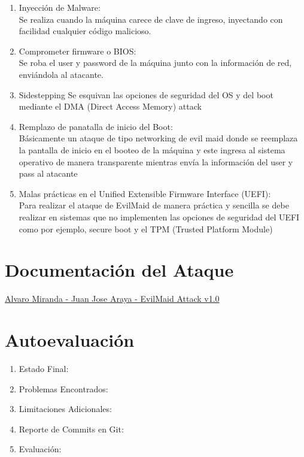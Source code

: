 \documentclass{article}
\begin{document}
\begin{enumerate}

  \item Inyección de Malware: \\
  Se realiza cuando la máquina carece de clave de ingreso, inyectando con facilidad cualquier código malicioso.
  
  \item Comprometer firmware o BIOS: \\
  Se roba el user y password de la máquina junto con la información de red, enviándola al atacante.
  
  \item Sidestepping
  Se esquivan las opciones de seguridad del OS y del boot mediante el DMA (Direct Access Memory) attack
  
  \item Remplazo de panatalla de inicio del Boot: \\
  Básicamente un ataque de tipo networking de evil maid donde se reemplaza la pantalla de inicio en el booteo de la máquina y este ingresa al sistema operativo de manera transparente mientras envía la información del user y pass al atacante
  
  \item Malas prácticas en el Unified Extensible Firmware Interface (UEFI): \\ 
  Para realizar el ataque de EvilMaid de manera práctica y sencilla se debe realizar en sistemas que no implementen las opciones de seguridad del UEFI como por ejemplo, secure boot y el TPM (Trusted Platform Module)
  
\end{enumerate}

\section*{Documentación del Ataque}

\href{https://drive.google.com/file/d/16Z2BiQohqdr1lCqQlngj6nGgPOOHObtK/view?usp=sharing}{Alvaro Miranda - Juan Jose Araya - EvilMaid Attack v1.0}

\section*{Autoevaluación}

\begin{enumerate}
    \item Estado Final:
    \item Problemas Encontrados:
    \item Limitaciones Adicionales:
    \item Reporte de Commits en Git:
    \item Evaluación:
\end{enumerate}
\end{document}
